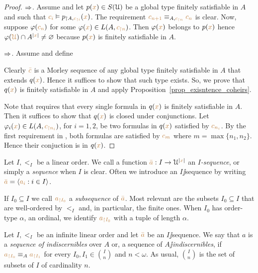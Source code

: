 \documentclass[creche.tex]{subfiles}
\begin{document}
\begin{proof}
$\Rightarrow$. Assume  and let $p({\color{brown} x})\in S(\EuScript U)$ be a global type finitely satisfiable in $A$ and such that ${\color{brown} c_i}\vDash p_{\restriction A,{\color{brown} c_{\restriction i}}}({\color{brown} x})$. The requirement ${\color{brown} c_{n+1}}\equiv_{A,{\color{brown} c_{\restriction n}}} {\color{brown} c_n}$ is clear. Now, suppose $\varphi({\color{brown} c_n})$ for some $\varphi({\color{brown} x})\in L(A,{\color{brown} c_{\restriction n}})$. Then $\varphi({\color{brown} x})$ belongs to $p({\color{brown} x})$ hence $\varphi({\color{brown}\EuScript U})\cap A^{|{\color{brown} x}|}\neq\varnothing$ because $p({\color{brown} x})$ is finitely satisfiable in $A$.

$\Rightarrow$. Assume  and define


Clearly ${\color{brown}\bar c}$ is a Morley sequence of any global type finitely satisfiable in $A$ that extends $q({\color{brown} x})$. Hence it suffices to show that such type exists. So, we prove that $q({\color{brown} x})$ is finitely satisfiable in $A$ and apply Proposition~\ref{prop_exisntence_coheirs}. 

Note that  requires that every single formula in $q({\color{brown} x})$ is finitely satisfiable in $A$. Then it suffices to show that $q({\color{brown} x})$ is closed under conjunctions. Let $\varphi_i({\color{brown} x})\in L(A,{\color{brown} c_{\restriction n_i}})$, for $i=1,2$, be two formulas in $q({\color{brown} x})$ satisfied by  ${\color{brown} c_{n_i}}$. By the first requirement in , both formulas are satisfied by ${\color{brown} c_m}$ where $m=\max\{n_1,n_2\}$. Hence their conjuction is in  $q({\color{brown} x})$.
\end{proof}


Let $I,<_I$ be a linear order. We call a function ${\color{brown}\bar a}:I\to\EuScript U^{|{\color{brown} x}|}$ an \emph{$I$-sequence}, or simply a \emph{sequence\/} when $I$ is clear. Often we introduce an $I\jj$sequence by writing ${\color{brown}\bar a}=\langle{\color{brown}a_i}: i\in I\rangle$. 

If $I_0\subseteq I$ we call ${\color{brown} a_{\restriction I_0}}$ a \emph{subsequence\/} of ${\color{brown}\bar a}$. Most relevant are the subsets $I_0\subseteq I$ that are well-ordered by $<_I$ and, in particular, the finite ones. When $I_0$ has order-type $\alpha$, an ordinal, we identify ${\color{brown} a_{\restriction I_0}}$ with a tuple of length $\alpha$.  

\begin{definition}
Let $I,<_I$ be an infinite linear order and let ${\color{brown}\bar a}$ be an $I\jj$sequence. We say that $a$ is a \emph{sequence of indiscernibles\/} over $A$ or, a sequence of \emph{$A\jj$indiscernibles}, if ${\color{brown} a_{\restriction I_0}}\equiv_A {\color{brown} a_{\restriction I_1}}$ for every $I_0,I_1\in{I\choose n}$ and $n<\omega$. As usual, \emph{${I\choose n}$\/} is the set of subsets of $I$ of cardinality $n$.\QED
\end{definition}
\end{document}
